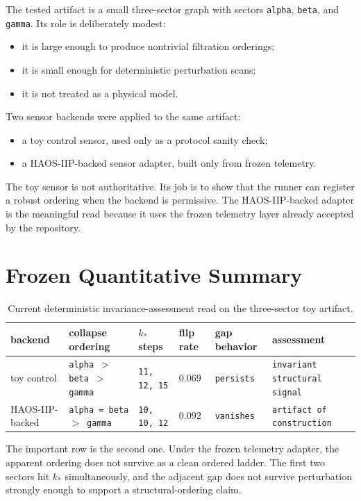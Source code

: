 \documentclass[11pt]{article}
\begin{document}
The tested artifact is a small three-sector graph with sectors \texttt{alpha}, \texttt{beta}, and \texttt{gamma}. Its role is deliberately modest:
\begin{itemize}
\item it is large enough to produce nontrivial filtration orderings;
\item it is small enough for deterministic perturbation scans;
\item it is not treated as a physical model.
\end{itemize}

Two sensor backends were applied to the same artifact:
\begin{itemize}
\item a toy control sensor, used only as a protocol sanity check;
\item a HAOS-IIP-backed sensor adapter, built only from frozen telemetry.
\end{itemize}

The toy sensor is not authoritative. Its job is to show that the runner can register a robust ordering when the backend is permissive. The HAOS-IIP-backed adapter is the meaningful read because it uses the frozen telemetry layer already accepted by the repository.

\section{Frozen Quantitative Summary}

\begin{table}[h!]
\centering
\small
\begin{tabular}{@{}p{2.5cm}p{2.7cm}p{2.0cm}p{1.5cm}p{1.8cm}p{3.4cm}@{}}
\toprule
backend & collapse ordering & \(k_{\ast}\) steps & flip rate & gap behavior & assessment \\
\midrule
toy control &
\texttt{alpha $>$ beta $>$ gamma} &
\texttt{11, 12, 15} &
\(0.069\) &
\texttt{persists} &
\texttt{invariant structural signal} \\
HAOS-IIP-backed &
\texttt{alpha = beta $>$ gamma} &
\texttt{10, 10, 12} &
\(0.092\) &
\texttt{vanishes} &
\texttt{artifact of construction} \\
\bottomrule
\end{tabular}
\caption{Current deterministic invariance-assessment read on the three-sector toy artifact.}
\end{table}

The important row is the second one. Under the frozen telemetry adapter, the apparent ordering does not survive as a clean ordered ladder. The first two sectors hit \(k_{\ast}\) simultaneously, and the adjacent gap does not survive perturbation strongly enough to support a structural-ordering claim.
\end{document}

